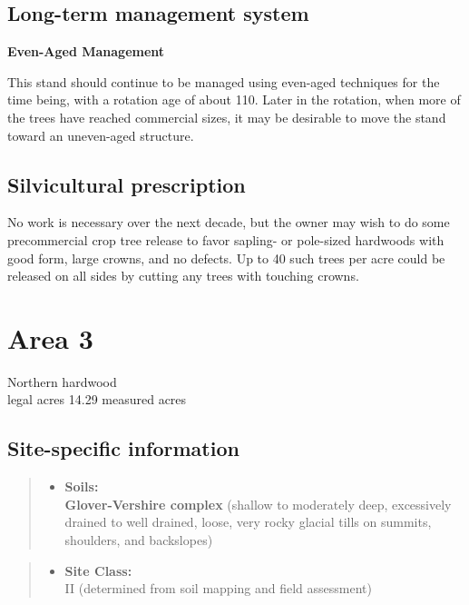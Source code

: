 \documentclass[]{tufte-handout}
\providecommand{\tightlist}{%
  \setlength{\itemsep}{0pt}\setlength{\parskip}{0pt}}
\begin{document}
\subsection{Long-term management
system}\label{long-term-management-system-1}

\textbf{Even-Aged Management}

This stand should continue to be managed using even-aged techniques for
the time being, with a rotation age of about 110. Later in the rotation,
when more of the trees have reached commercial sizes, it may be
desirable to move the stand toward an uneven-aged structure.

\subsection{Silvicultural
prescription}\label{silvicultural-prescription-1}

No work is necessary over the next decade, but the owner may wish to do
some precommercial crop tree release to favor sapling- or pole-sized
hardwoods with good form, large crowns, and no defects. Up to 40 such
trees per acre could be released on all sides by cutting any trees with
touching crowns.

\newpage

\section{Area 3}\label{area-3}

Northern hardwood\\
 legal acres \textbar{} 14.29 measured acres

\subsection{Site-specific
information}\label{site-specific-information-2}

\begin{quote}
\begin{itemize}
\tightlist
\item
  \textbf{Soils:}\\
  \indent\indent  \textbf{Glover-Vershire complex} (shallow to
  moderately deep, excessively drained to well drained, loose, very
  rocky glacial tills on summits, shoulders, and backslopes)
\end{itemize}
\end{quote}

\begin{quote}
\begin{itemize}
\tightlist
\item
  \textbf{Site Class:}\\
  \vspace{2pt} II (determined from soil mapping and field assessment)
\end{itemize}
\end{quote}
\end{document}
